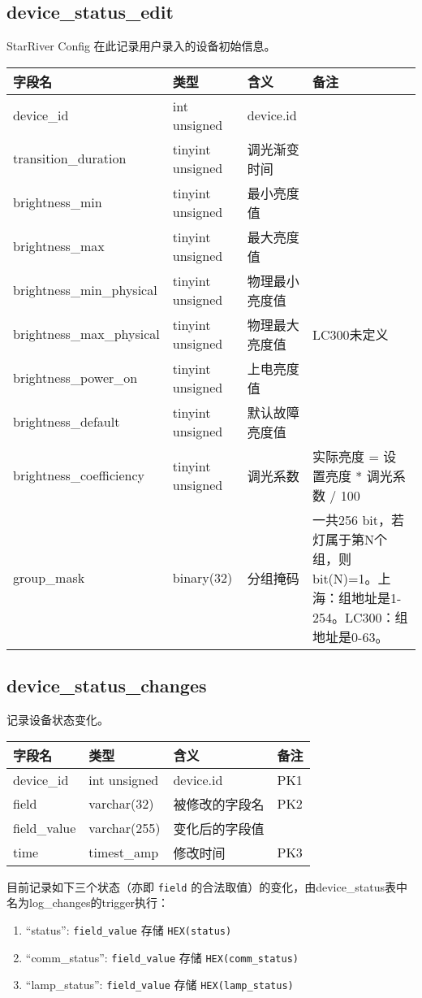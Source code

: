 \subsection{device\_status\_edit}\label{deviceux5fstatusux5fedit}

StarRiver Config 在此记录用户录入的设备初始信息。

\begin{longtabu}[c]{@{}lXXX@{}}
\toprule
字段名 & 类型 & 含义 & 备注\tabularnewline
\midrule
\endhead
device\_id & int unsigned & device.id &\tabularnewline
transition\_duration & tinyint unsigned & 调光渐变时间 &\tabularnewline
brightness\_min & tinyint unsigned & 最小亮度值 &\tabularnewline
brightness\_max & tinyint unsigned & 最大亮度值 &\tabularnewline
brightness\_min\_physical & tinyint unsigned & 物理最小亮度值
&\tabularnewline
brightness\_max\_physical & tinyint unsigned & 物理最大亮度值 &
LC300未定义\tabularnewline
brightness\_power\_on & tinyint unsigned & 上电亮度值 &\tabularnewline
brightness\_default & tinyint unsigned & 默认故障亮度值 &\tabularnewline
brightness\_coefficiency & tinyint unsigned & 调光系数 & 实际亮度 =
设置亮度 * 调光系数 / 100\tabularnewline
group\_mask & binary(32) & 分组掩码 & 一共256
bit，若灯属于第N个组，则bit(N)=1。上海：组地址是1-254。LC300：组地址是0-63。\tabularnewline
\bottomrule
\end{longtabu}

\subsection{device\_status\_changes}\label{deviceux5fstatusux5fchanges}

记录设备状态变化。

\begin{longtabu}[c]{@{}lXXX@{}}
\toprule
字段名 & 类型 & 含义 & 备注\tabularnewline
\midrule
\endhead
device\_id & int unsigned & device.id & PK1\tabularnewline
field & varchar(32) & 被修改的字段名 & PK2\tabularnewline
field\_value & varchar(255) & 变化后的字段值 &\tabularnewline
time & timest\_amp & 修改时间 & PK3\tabularnewline
\bottomrule
\end{longtabu}

目前记录如下三个状态（亦即 \texttt{field}
的合法取值）的变化，由device\_status表中名为log\_changes的trigger执行：

\begin{enumerate}
\def\labelenumi{\arabic{enumi}.}
\itemsep1pt\parskip0pt
\item
  ``status'': \texttt{field\_value} 存储 \texttt{HEX(status)}
\item
  ``comm\_status'': \texttt{field\_value} 存储
  \texttt{HEX(comm\_status)}
\item
  ``lamp\_status'': \texttt{field\_value} 存储
  \texttt{HEX(lamp\_status)}
\end{enumerate}

